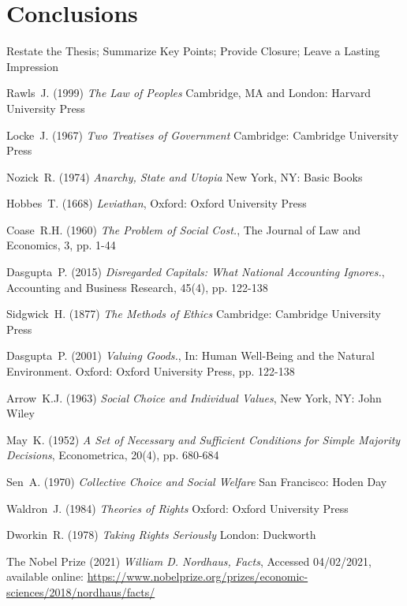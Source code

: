 \documentclass[11pt, oneside]{article}   	%
\begin{document}
\section{Conclusions}

Restate the Thesis;
Summarize Key Points;
Provide Closure;
Leave a Lasting Impression

\begin{thebibliography}{99}

 Rawls~J. (1999)
\emph{The Law of Peoples}
Cambridge, MA and London: Harvard University Press

 Locke~J. (1967)
\emph{Two Treatises of Government}
Cambridge: Cambridge University Press
	
 Nozick~R. (1974)
\emph{Anarchy, State and Utopia}
New York, NY: Basic Books
	
 Hobbes~T. (1668)
\emph{Leviathan},
Oxford: Oxford University Press

 Coase~R.H. (1960)
\emph{The Problem of Social Cost.},
The Journal of Law and Economics, 3, pp. 1-44

 Dasgupta~P. (2015)
\emph{Disregarded Capitals: What National Accounting Ignores.},
Accounting and Business Research, 45(4), pp. 122-138

 Sidgwick~H. (1877)
\emph{The Methods of Ethics}
Cambridge: Cambridge University Press

 Dasgupta~P. (2001)
\emph{Valuing Goods.},
In: Human Well-Being and the Natural Environment. Oxford: Oxford University Press, pp. 122-138

 Arrow~K.J. (1963)
\emph{Social Choice and Individual Values},
New York, NY: John Wiley
	
 May~K. (1952)
\emph{A Set of Necessary and Sufficient Conditions for Simple Majority Decisions},
Econometrica, 20(4), pp. 680-684

 Sen~A. (1970)
\emph{Collective Choice and Social Welfare}
San Francisco: Hoden Day

 Waldron~J. (1984)
\emph{Theories of Rights}
Oxford: Oxford University Press
		
 Dworkin~R. (1978)
\emph{Taking Rights Seriously}
London: Duckworth

 The Nobel Prize (2021)
\emph{William D. Nordhaus, Facts},
Accessed 04/02/2021, available online: 
\url{https://www.nobelprize.org/prizes/economic-sciences/2018/nordhaus/facts/}


\end{thebibliography}
\end{document}
